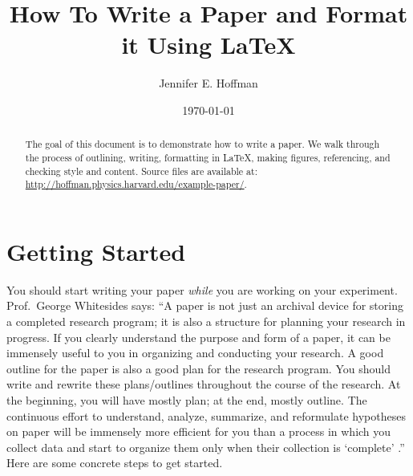 \documentclass[aps,prb,twocolumn,superscriptaddress,floatfix,longbibliography]{revtex4-2}
\newif\ifptitle
\newif\ifpnumber
\newcounter{para}
\newcommand\ptitle[1]{\par\refstepcounter{para}
{\ifpnumber{\noindent\textcolor{lightgray}{\textbf{\thepara}}\indent}\fi}
{\ifptitle{\textbf{[{#1}]}}\fi}}
\newcommand{\mytitle}{How To Write a Paper and Format it Using \LaTeX}
\begin{document}
\title{\mytitle}

\author{Jennifer E. Hoffman}

\date{\today}

\begin{abstract}
The goal of this document is to demonstrate how to write a paper. We walk through the process of outlining, writing, formatting in \LaTeX, making figures, referencing, and checking style and content. Source files are available at: \url{http://hoffman.physics.harvard.edu/example-paper/}.
\end{abstract}

\maketitle
\section{\label{sec:Start}Getting Started}

\ptitle{Start writing while you experiment} You should start writing your paper \textit{while} you are working on your experiment. Prof.\ George Whitesides says: ``A paper is not just an archival device for storing a completed research program; it is also a structure for planning your research in progress. If you clearly understand the purpose and form of a paper, it can be immensely useful to you in organizing and conducting your research. A good outline for the paper is also a good plan for the research program. You should write and rewrite these plans/outlines throughout the course of the research. At the beginning, you will have mostly plan; at the end, mostly outline. The continuous effort to understand, analyze, summarize, and reformulate hypotheses on paper will be immensely more efficient for you than a process in which you collect data and start to organize them only when their collection is `complete' .'' Here are some concrete steps to get started.
\end{document}

